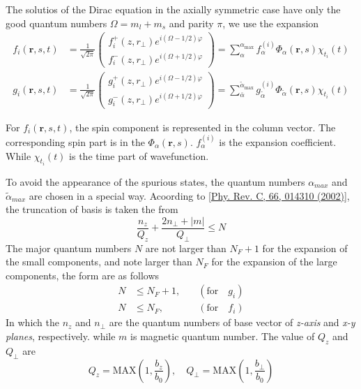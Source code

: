 The solutios of the Dirac equation in the axially symmetric case have only the good quantum numbers $\Omega = m_l + m_s$ and parity $\pi$, we use the expansion
\begin{align}
    f_{i}(\boldsymbol{r}, s, t) &= \frac{1}{\sqrt{2 \pi}}
    \left(\begin{array}{l}
    f_{i}^{+}\left(z, r_{\perp}\right) e^{i(\Omega-1 / 2) \varphi} \\
    f_{i}^{-}\left(z, r_{\perp}\right) e^{i(\Omega+1 / 2) \varphi}
    \end{array}\right)
    =\sum_{\alpha}^{\alpha_{\max }} f_{\alpha}^{(i)} \Phi_{\alpha}(\boldsymbol{r}, s) \chi_{t_{i}}(t)  \label{oc_fi_hos} \\
    g_{i}(\boldsymbol{r}, s, t) &= \frac{1}{\sqrt{2 \pi}}
    \left(\begin{array}{l}
    g_{i}^{+}\left(z, r_{\perp}\right) e^{i(\Omega-1 / 2) \varphi} \\
    g_{i}^{-}\left(z, r_{\perp}\right) e^{i(\Omega+1 / 2) \varphi}
    \end{array}\right)
    =\sum_{\bar{\alpha}}^{\tilde{\alpha}_{\max }} g_{\tilde{\alpha}}^{(i)} \Phi_{\tilde{\alpha}}(\boldsymbol{r}, s) \chi_{t_{i}}(t) \label{oc_gi_hos}
\end{align}
\begin{note}
    For $f_i(\boldsymbol{r}, s, t)$, the spin component is represented in the column vector. The corresponding spin part is in the $\Phi_{\alpha}(\boldsymbol{r}, s)$. $f_{\alpha}^{(i)}$ is the expansion coefficient. While $\chi_{t_{i}}(t)$ is the time part of wavefunction.
\end{note}
To avoid the appearance of the spurious states, the quantum numbers $\alpha_{max}$ and $\tilde{\alpha}_{max}$ are chosen in a special way. Acoording to \href{https://journals.aps.org/prc/abstract/10.1103/PhysRevC.66.014310}{[Phy. Rev. C, 66, 014310 (2002)]}, the truncation of basis is taken the from
\begin{equation}
\frac{n_z}{Q_z} + \frac{2n_{\perp} + |m|}{Q_{\perp}} \leqslant N \label{oc_basis_truncate}
\end{equation}
The major quantum numbers $N$ are not larger than $N_F + 1$ for the expansion of the small components, and note larger than $N_F$ for the expansion of the large components, the form are as follows
\begin{equation}
\begin{aligned}
  N &\leqslant N_F + 1, \quad &(\text{for} \quad g_i) \\
  N &\leqslant N_F, \quad &(\text{for} \quad f_i)
\end{aligned}
\end{equation}
In which the $n_z$ and $n_{\perp}$ are the quantum numbers of base vector of \textit{z-axis} and \textit{x-y planes}, respectively. while $m$ is magnetic quantum number. The value of $Q_{z}$ and $Q_{\perp}$ are
\begin{equation}
Q_z = \text{MAX}(1, \frac{b_z}{b_0}), \quad Q_{\perp} = \text{MAX}(1, \frac{b_{\perp}}{b_0})
\end{equation}

